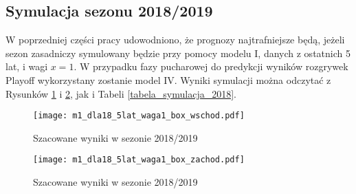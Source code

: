 \documentclass[inzynierska]{pwr_wmat_praca_dyplomowa}
\theoremstyle{plain}
\numberwithin{theorem}{chapter}
\theoremstyle{definition}
\numberwithin{theorem}{chapter}
\begin{document}
\subsection{Symulacja sezonu 2018/2019}
W poprzedniej części pracy udowodniono, że prognozy najtrafniejsze będą, jeżeli sezon zasadniczy symulowany będzie przy pomocy modelu I, danych z ostatnich 5 lat, i wagi $x=1$. W przypadku fazy pucharowej do predykcji wyników rozgrywek Playoff wykorzystany zostanie model IV. Wyniki symulacji można odczytać z Rysunków \ref{m1_dla18_5lat_waga1_box_wschod} i \ref{m1_dla18_5lat_waga1_box_zachod}, jak i Tabeli \ref{tabela_symulacja_2018}.
\begin{figure}[t]
	\hspace*{-3cm}  
	\texttt{[image: m1\_dla18\_5lat\_waga1\_box\_wschod.pdf]}
	\caption{Szacowane wyniki w sezonie 2018/2019}
	\label{m1_dla18_5lat_waga1_box_wschod}
	\centering
\end{figure}
\begin{figure}[t]
	\hspace*{-3cm}  
	\texttt{[image: m1\_dla18\_5lat\_waga1\_box\_zachod.pdf]}
	\caption{Szacowane wyniki w sezonie 2018/2019}
	\label{m1_dla18_5lat_waga1_box_zachod}
	\centering
\end{figure}
\end{document}
